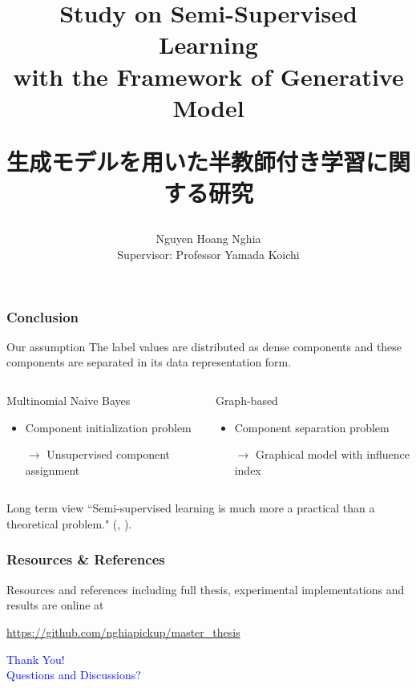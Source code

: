 \documentclass[handout]{beamer}
\newcounter{c}
\begin{document}
	\author{Nguyen Hoang Nghia \\ Supervisor: Professor Yamada Koichi}
	\title{Study on Semi-Supervised Learning \\with the Framework of Generative Model \\ 
		\begin{CJK}{UTF8}{min}\large 生成モデルを用いた半教師付き学習に関する研究 \end{CJK}}
	\date{}
	
	\thispagestyle{empty}
	\frame{\titlepage}
	
	
	
	
	
	\begin{frame}
		\frametitle{Conclusion}
		\begin{block}{Our assumption}
			The label values are distributed as dense components and these components are separated in its data representation form.
		\end{block}
	
		\begin{columns}
			\begin{block}{Multinomial Naive Bayes}
				\begin{itemize}
					\item Component initialization problem
					\item[$\rightarrow$] Unsupervised component assignment
				\end{itemize}
				
			\end{block}
			\begin{block}{Graph-based}
				\begin{itemize}
					\item Component separation problem
					\item[$\rightarrow$] Graphical model with influence index
				\end{itemize}
			\end{block}
		\end{columns}
	
		\begin{block}{Long term view}
			``Semi-supervised learning is much more a practical than a theoretical problem." (\citeauthor{Olivier2006}, ).
		\end{block}
	\end{frame}

	\begin{frame}
		\frametitle{Resources \& References}
		Resources and references including full thesis, experimental implementations and results are online at 
		
		\centering 
		\url{https://github.com/nghiapickup/master_thesis}
		
		\vspace{2cm}
		
		\LARGE \textcolor{blue}{Thank You! \\ Questions and Discussions?}
	\end{frame}

	
\end{document}

